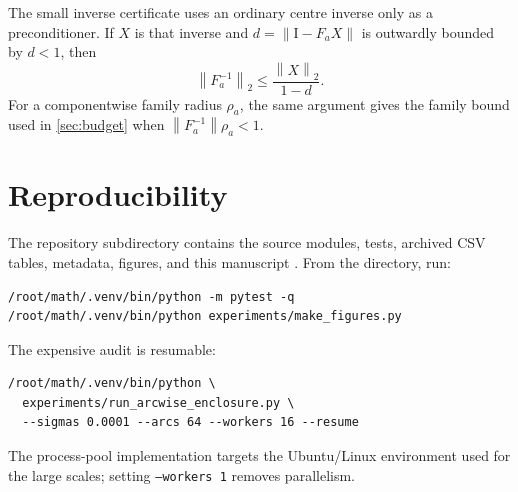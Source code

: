\documentclass[11pt]{article}
\theoremstyle{definition}
\theoremstyle{remark}
\newcommand{\Id}{\mathrm I}
\newcommand{\norm}[1]{\left\lVert#1\right\rVert}
\begin{document}
The small inverse certificate uses an ordinary centre inverse only as a
preconditioner.  If $X$ is that inverse and
$d=\norm{\Id-F_aX}$ is outwardly bounded by $d<1$, then
\[
 \norm{F_a^{-1}}_2\leq\frac{\norm{X}_2}{1-d}.
\]
For a componentwise family radius $\rho_a$, the same argument gives the
family bound used in \cref{sec:budget} when
$\norm{F_a^{-1}}\rho_a<1$.

\section{Reproducibility}
\label{app:reproducibility}

The repository subdirectory contains the source modules, tests, archived CSV
tables, metadata, figures, and this manuscript \citep{WangArcwiseCode2026}.
From the directory, run:
\begin{verbatim}
/root/math/.venv/bin/python -m pytest -q
/root/math/.venv/bin/python experiments/make_figures.py
\end{verbatim}
The expensive audit is resumable:
\begin{verbatim}
/root/math/.venv/bin/python \
  experiments/run_arcwise_enclosure.py \
  --sigmas 0.0001 --arcs 64 --workers 16 --resume
\end{verbatim}
The process-pool implementation targets the Ubuntu/Linux environment used
for the large scales; setting \texttt{--workers 1} removes parallelism.



\end{document}
